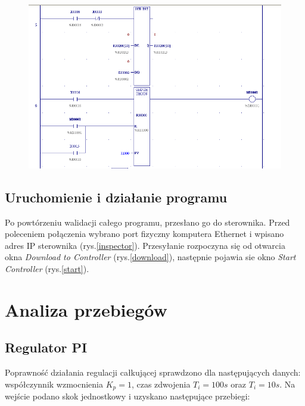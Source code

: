 \documentclass[12pt]{article}
\begin{document}
\begin{figure}[H]
    \centering
    \includegraphics[width = \textwidth]{./zdj/network4.png}
\end{figure}



\subsection{Uruchomienie i działanie programu}
Po powtórzeniu walidacji całego programu, przesłano go do sterownika. Przed poleceniem połączenia wybrano port fizyczny komputera Ethernet i wpisano adres IP sterownika (rys.\ref{inspector}).
Przesyłanie rozpoczyna się od otwarcia okna \textit{Download to Controller} (rys.\ref{download}), następnie pojawia sie okno \textit{Start Controller} (rys.\ref{start}).


\section{Analiza przebiegów}
\subsection{Regulator PI}
Poprawność działania regulacji całkującej sprawdzono dla następujących danych: współczynnik wzmocnienia $K_p=1$, czas zdwojenia $T_i = 100s$ oraz $T_i = 10s$. Na wejście podano skok jednostkowy i uzyskano następujące przebiegi:
\end{document}
